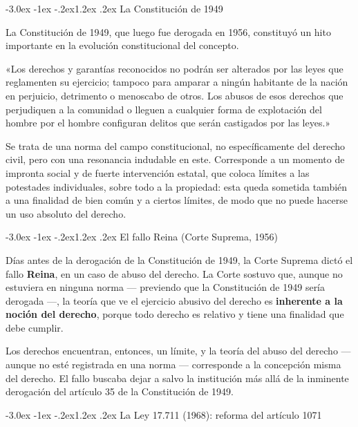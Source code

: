 \documentclass[12pt,oneside]{book}
\makeatletter
\renewcommand\section{\@startsection{section}{1}{\z@}%
  {-3.0ex \@plus -1ex \@minus -.2ex}{1.2ex \@plus .2ex}%
  {\normalfont\large\bfseries\color{acento}}}
\makeatother
\begin{document}
\section{La Constitución de 1949}

La Constitución de 1949, que luego fue derogada en 1956, constituyó un hito importante en la evolución constitucional del concepto.

\begin{regla}
«Los derechos y garantías reconocidos no podrán ser alterados por las leyes que reglamenten su ejercicio; tampoco para amparar a ningún habitante de la nación en perjuicio, detrimento o menoscabo de otros. Los abusos de esos derechos que perjudiquen a la comunidad o lleguen a cualquier forma de explotación del hombre por el hombre configuran delitos que serán castigados por las leyes.»
\end{regla}

Se trata de una norma del campo constitucional, no específicamente del derecho civil, pero con una resonancia indudable en este. Corresponde a un momento de impronta social y de fuerte intervención estatal, que coloca límites a las potestades individuales, sobre todo a la propiedad: esta queda sometida también a una finalidad de bien común y a ciertos límites, de modo que no puede hacerse un uso absoluto del derecho.

\section{El fallo Reina (Corte Suprema, 1956)}

Días antes de la derogación de la Constitución de 1949, la Corte Suprema dictó el fallo \textbf{Reina}, en un caso de abuso del derecho. La Corte sostuvo que, aunque no estuviera en ninguna norma --- previendo que la Constitución de 1949 sería derogada ---, la teoría que ve el ejercicio abusivo del derecho es \textbf{inherente a la noción del derecho}, porque todo derecho es relativo y tiene una finalidad que debe cumplir.

Los derechos encuentran, entonces, un límite, y la teoría del abuso del derecho --- aunque no esté registrada en una norma --- corresponde a la concepción misma del derecho. El fallo buscaba dejar a salvo la institución más allá de la inminente derogación del artículo 35 de la Constitución de 1949.

\section{La Ley 17.711 (1968): reforma del artículo 1071}
\end{document}
